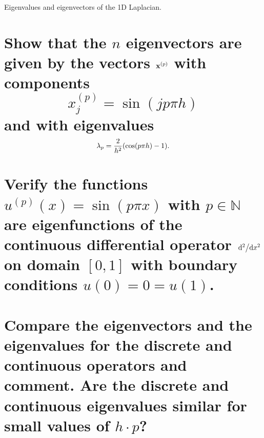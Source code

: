 \documentclass[boxes]{homework}
\begin{document}
\begin{problem}
Eigenvalues and eigenvectors of the 1D Laplacian.
\begin{parts}
	\part{Show that the $n$ eigenvectors are given by the vectors $\vb{x}^{(p)}$ with components
		\begin{equation*}
			x_j^{(p)} = \sin(jp\pi h)
		\end{equation*}
		and with eigenvalues
		\begin{equation*}
			\lambda_p = \frac{2}{h^2}\qty(\cos(p\pi h) - 1).
		\end{equation*}}\label{part:1a}
	\part{Verify the functions $u^{(p)}(x) = \sin(p\pi x)$ with $p\in\mathbb{N}$ are eigenfunctions of the continuous differential operator $\dv*[2]{x}$ on domain $[0, 1]$ with boundary conditions $u(0) = 0 = u(1)$.}\label{part:1b}
	\part{Compare the eigenvectors and the eigenvalues for the discrete and continuous operators and comment. Are the discrete and continuous eigenvalues similar for small values of $h\cdot p$?}\label{part:1c}
\end{parts}
\end{problem}
\end{document}
